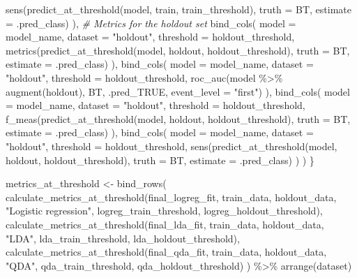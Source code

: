 \documentclass[
]{article}
\newenvironment{Shaded}{\begin{snugshade}}{\end{snugshade}}
\newcommand{\AttributeTok}[1]{\textcolor[rgb]{0.77,0.63,0.00}{#1}}
\newcommand{\CommentTok}[1]{\textcolor[rgb]{0.56,0.35,0.01}{\textit{#1}}}
\newcommand{\FunctionTok}[1]{\textcolor[rgb]{0.00,0.00,0.00}{#1}}
\newcommand{\NormalTok}[1]{#1}
\newcommand{\OtherTok}[1]{\textcolor[rgb]{0.56,0.35,0.01}{#1}}
\newcommand{\SpecialCharTok}[1]{\textcolor[rgb]{0.00,0.00,0.00}{#1}}
\newcommand{\StringTok}[1]{\textcolor[rgb]{0.31,0.60,0.02}{#1}}
\begin{document}
\begin{Shaded}
\begin{Highlighting}[]
      \FunctionTok{sens}\NormalTok{(}\FunctionTok{predict\_at\_threshold}\NormalTok{(model, train, train\_threshold), }\AttributeTok{truth =}\NormalTok{ BT, }\AttributeTok{estimate =}\NormalTok{ .pred\_class)}
\NormalTok{    ),}
    \CommentTok{\# Metrics for the holdout set}
    \FunctionTok{bind\_cols}\NormalTok{(}
      \AttributeTok{model =}\NormalTok{ model\_name,}
      \AttributeTok{dataset =} \StringTok{"holdout"}\NormalTok{,}
      \AttributeTok{threshold =}\NormalTok{ holdout\_threshold,}
      \FunctionTok{metrics}\NormalTok{(}\FunctionTok{predict\_at\_threshold}\NormalTok{(model, holdout, holdout\_threshold), }\AttributeTok{truth =}\NormalTok{ BT, }\AttributeTok{estimate =}\NormalTok{ .pred\_class)}
\NormalTok{    ),}
    \FunctionTok{bind\_cols}\NormalTok{(}
      \AttributeTok{model =}\NormalTok{ model\_name,}
      \AttributeTok{dataset =} \StringTok{"holdout"}\NormalTok{,}
      \AttributeTok{threshold =}\NormalTok{ holdout\_threshold,}
      \FunctionTok{roc\_auc}\NormalTok{(model }\SpecialCharTok{\%\textgreater{}\%} \FunctionTok{augment}\NormalTok{(holdout), BT, .pred\_TRUE, }\AttributeTok{event\_level =} \StringTok{"first"}\NormalTok{)}
\NormalTok{    ),}
    \FunctionTok{bind\_cols}\NormalTok{(}
      \AttributeTok{model =}\NormalTok{ model\_name,}
      \AttributeTok{dataset =} \StringTok{"holdout"}\NormalTok{,}
      \AttributeTok{threshold =}\NormalTok{ holdout\_threshold,}
      \FunctionTok{f\_meas}\NormalTok{(}\FunctionTok{predict\_at\_threshold}\NormalTok{(model, holdout, holdout\_threshold), }\AttributeTok{truth =}\NormalTok{ BT, }\AttributeTok{estimate =}\NormalTok{ .pred\_class)}
\NormalTok{    ),}
    \FunctionTok{bind\_cols}\NormalTok{(}
      \AttributeTok{model =}\NormalTok{ model\_name,}
      \AttributeTok{dataset =} \StringTok{"holdout"}\NormalTok{,}
      \AttributeTok{threshold =}\NormalTok{ holdout\_threshold,}
      \FunctionTok{sens}\NormalTok{(}\FunctionTok{predict\_at\_threshold}\NormalTok{(model, holdout, holdout\_threshold), }\AttributeTok{truth =}\NormalTok{ BT, }\AttributeTok{estimate =}\NormalTok{ .pred\_class)}
\NormalTok{    )}
\NormalTok{  )}
\NormalTok{\}}

\NormalTok{metrics\_at\_threshold }\OtherTok{\textless{}{-}} \FunctionTok{bind\_rows}\NormalTok{(}
    \FunctionTok{calculate\_metrics\_at\_threshold}\NormalTok{(final\_logreg\_fit, train\_data, holdout\_data, }\StringTok{"Logistic regression"}\NormalTok{, logreg\_train\_threshold, logreg\_holdout\_threshold),}
    \FunctionTok{calculate\_metrics\_at\_threshold}\NormalTok{(final\_lda\_fit, train\_data, holdout\_data, }\StringTok{"LDA"}\NormalTok{, lda\_train\_threshold, lda\_holdout\_threshold),}
    \FunctionTok{calculate\_metrics\_at\_threshold}\NormalTok{(final\_qda\_fit, train\_data, holdout\_data, }\StringTok{"QDA"}\NormalTok{, qda\_train\_threshold, qda\_holdout\_threshold)}
\NormalTok{) }\SpecialCharTok{\%\textgreater{}\%} \FunctionTok{arrange}\NormalTok{(dataset)}
\end{Highlighting}
\end{Shaded}
\end{document}
